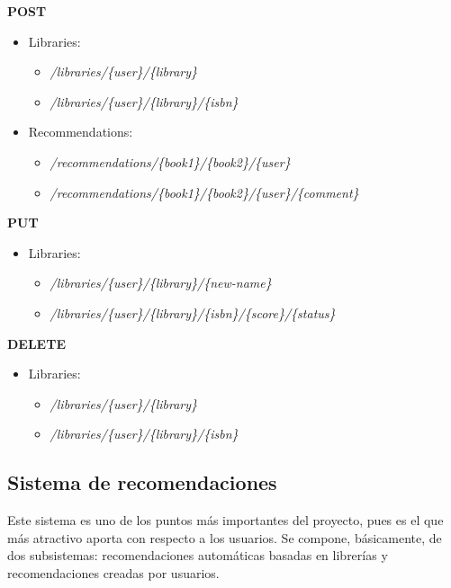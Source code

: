 \textbf{POST}
\begin{itemize}
    \item Libraries:
    \begin{itemize}
        \item \textit{/libraries/\{user\}/\{library\}}
        \item \textit{/libraries/\{user\}/\{library\}/\{isbn\}}
    \end{itemize}
    \item Recommendations:
    \begin{itemize}
        \item \textit{/recommendations/\{book1\}/\{book2\}/\{user\}}
        \item \textit{/recommendations/\{book1\}/\{book2\}/\{user\}/\{comment\}}
    \end{itemize}
\end{itemize}

\textbf{PUT}
\begin{itemize}
    \item Libraries:
    \begin{itemize}
        \item \textit{/libraries/\{user\}/\{library\}/\{new-name\}}
        \item \textit{/libraries/\{user\}/\{library\}/\{isbn\}/\{score\}/\{status\}}
    \end{itemize}
\end{itemize}

\textbf{DELETE}
\begin{itemize}
    \item Libraries:
    \begin{itemize}
        \item \textit{/libraries/\{user\}/\{library\}}
        \item \textit{/libraries/\{user\}/\{library\}/\{isbn\}}
    \end{itemize}
\end{itemize}

\subsection{Sistema de recomendaciones}

Este sistema es uno de los puntos más importantes del proyecto, pues es el que más atractivo aporta con respecto a los usuarios. Se compone, básicamente, de dos subsistemas: recomendaciones automáticas basadas en librerías y recomendaciones creadas por usuarios.

